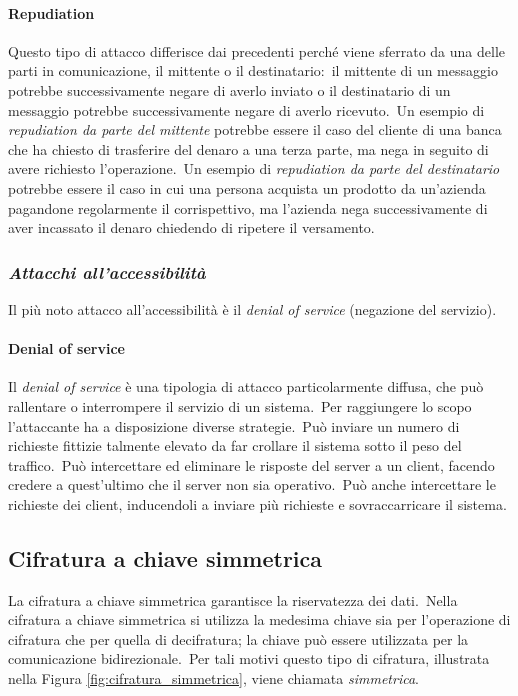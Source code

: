 \paragraph{Repudiation} Questo tipo di attacco differisce dai precedenti perché viene sferrato da una delle parti in comunicazione, il mittente o il destinatario:\ il mittente di un messaggio potrebbe successivamente negare di averlo inviato o il destinatario di un messaggio potrebbe successivamente negare di averlo ricevuto.\
Un esempio di \textit{repudiation da parte del mittente} potrebbe essere il caso del cliente di una banca che ha chiesto di trasferire del denaro a una terza parte, ma nega in seguito di avere richiesto l'operazione.\
Un esempio di \textit{repudiation da parte del destinatario} potrebbe essere il caso in cui una persona acquista un prodotto da un'azienda pagandone regolarmente il corrispettivo, ma l'azienda nega successivamente di aver incassato il denaro chiedendo di ripetere il versamento.

\subsubsection{\textit{Attacchi all'accessibilità}}

Il più noto attacco all'accessibilità è il \textit{denial of service} (negazione del servizio).

\paragraph{Denial of service} Il \textit{denial of service} è una tipologia di attacco particolarmente diffusa, che può rallentare o interrompere il servizio di un sistema.\
Per raggiungere lo scopo l'attaccante ha a disposizione diverse strategie.\
Può inviare un numero di richieste fittizie talmente elevato da far crollare il sistema sotto il peso del traffico.\
Può intercettare ed eliminare le risposte del server a un client, facendo credere a quest'ultimo che il server non sia operativo.\
Può anche intercettare le richieste dei client, inducendoli a inviare più richieste e sovraccarricare il sistema.

\subsection{Cifratura a chiave simmetrica}

La cifratura a chiave simmetrica garantisce la riservatezza dei dati.\
Nella cifratura a chiave simmetrica si utilizza la medesima chiave sia per l'operazione di cifratura che per quella di decifratura; la chiave può essere utilizzata per la comunicazione bidirezionale.\
Per tali motivi questo tipo di cifratura, illustrata nella Figura \ref{fig:cifratura_simmetrica}, viene chiamata \textit{simmetrica}.

